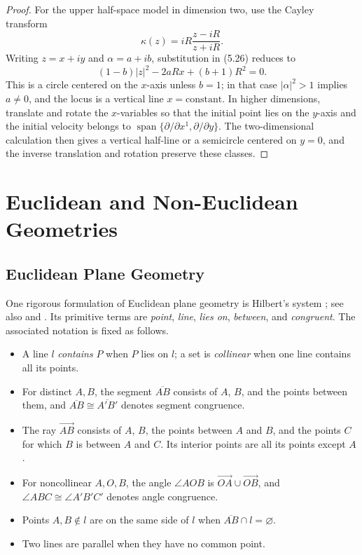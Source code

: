 \begin{theorem}
\begin{proof}
For the upper half-space model in dimension two, use the Cayley transform
\[
\kappa(z)=iR\frac{z-iR}{z+iR}.
\]
Writing $z=x+iy$ and $\alpha=a+ib$, substitution in (5.26) reduces to
\[
(1-b)|z|^2-2aRx+(b+1)R^2=0.
\]
This is a circle centered on the $x$-axis unless $b=1$; in that case
$|\alpha|^2>1$ implies $a\ne0$, and the locus is a vertical line
$x=\text{constant}$. In higher dimensions, translate and rotate the
$x$-variables so that the initial point lies on the $y$-axis and the initial
velocity belongs to
$\operatorname{span}\{\partial/\partial x^1,\partial/\partial y\}$. The
two-dimensional calculation then gives a vertical half-line or a semicircle
centered on $y=0$, and the inverse translation and rotation preserve these
classes.
\end{proof}
\end{theorem}

\section{Euclidean and Non-Euclidean Geometries}

\subsection*{Euclidean Plane Geometry}

One rigorous formulation of Euclidean plane geometry is Hilbert's system
\cite{Hil71}; see also \cite{Gan73,Gre93} and \cite{LeeAG}. Its
primitive terms are \emph{point}, \emph{line}, \emph{lies on}, \emph{between},
and \emph{congruent}. The associated notation is fixed as follows.
\begin{itemize}
\item A line $l$ \emph{contains} $P$ when $P$ lies on $l$; a set is
\emph{collinear} when one line contains all its points.
\item For distinct $A,B$, the segment $\overline{AB}$ consists of $A$, $B$,
and the points between them, and $\overline{AB}\cong\overline{A'B'}$ denotes
segment congruence.
\item The ray $\overrightarrow{AB}$ consists of $A$, $B$, the points between
$A$ and $B$, and the points $C$ for which $B$ is between $A$ and $C$. Its
interior points are all its points except $A$.
\item For noncollinear $A,O,B$, the angle $\angle AOB$ is
$\overrightarrow{OA}\cup\overrightarrow{OB}$, and
$\angle ABC\cong\angle A'B'C'$ denotes angle congruence.
\item Points $A,B\notin l$ are on the same side of $l$ when
$\overline{AB}\cap l=\varnothing$.
\item Two lines are parallel when they have no common point.
\end{itemize}

